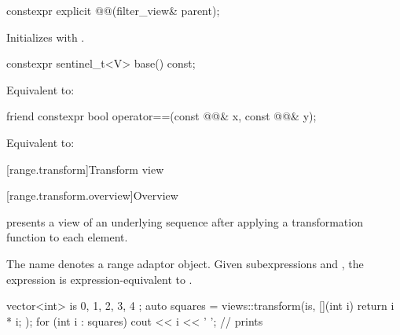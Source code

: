 %
\begin{itemdecl}
constexpr explicit @@(filter_view& parent);
\end{itemdecl}

\begin{itemdescr}
\pnum
\effects
Initializes  with .
\end{itemdescr}

%
\begin{itemdecl}
constexpr sentinel_t<V> base() const;
\end{itemdecl}

\begin{itemdescr}
\pnum
\effects
Equivalent to: 
\end{itemdescr}

%
\begin{itemdecl}
friend constexpr bool operator==(const @@& x, const @@& y);
\end{itemdecl}

\begin{itemdescr}
\pnum
\effects
Equivalent to: 
\end{itemdescr}

[range.transform]{Transform view}

[range.transform.overview]{Overview}

\pnum
{} presents
a view of an underlying sequence after
applying a transformation function to each element.

\pnum
{}%
The name  denotes a
range adaptor object.
Given subexpressions  and , the expression
 is expression-equivalent to
.

\pnum
\begin{example}
\begin{codeblock}
vector<int> is{ 0, 1, 2, 3, 4 };
auto squares = views::transform(is, [](int i) { return i * i; });
for (int i : squares)
  cout << i << ' '; // prints 
\end{codeblock}
\end{example}

